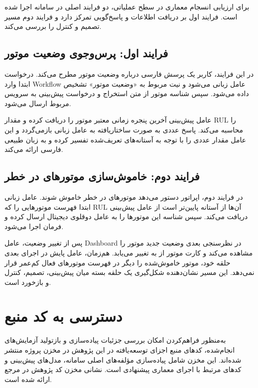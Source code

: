 برای ارزیابی انسجام معماری در سطح عملیاتی، دو فرایند اصلی در سامانه اجرا شده است. فرایند اول بر دریافت اطلاعات و پاسخ‌گویی تمرکز دارد و فرایند دوم مسیر تصمیم و کنترل را بررسی می‌کند.

\subsection{فرایند اول: پرس‌وجوی وضعیت موتور}

در این فرایند، کاربر یک پرسش فارسی درباره وضعیت موتور مطرح می‌کند. درخواست ابتدا وارد \gls{Workflow} عامل زبانی می‌شود و نیت مربوط به «وضعیت موتور» تشخیص داده می‌شود. سپس شناسه موتور از متن استخراج و درخواست پیش‌بینی به سرویس مربوط ارسال می‌شود.

عامل پیش‌بینی آخرین پنجره زمانی معتبر موتور را دریافت کرده و مقدار \gls{RUL} را محاسبه می‌کند. پاسخ عددی به صورت ساختاریافته به عامل زبانی بازمی‌گردد و این عامل مقدار عددی را با توجه به آستانه‌های تعریف‌شده تفسیر کرده و به زبان طبیعی فارسی ارائه می‌کند.



\subsection{فرایند دوم: خاموش‌سازی موتورهای در خطر}

در فرایند دوم، اپراتور دستور می‌دهد موتورهای در خطر خاموش شوند. عامل زبانی ابتدا فهرست موتورهایی را که \gls{RUL} آن‌ها از آستانه پایین‌تر است از عامل پیش‌بینی دریافت می‌کند. سپس شناسه این موتورها را به عامل دوقلوی دیجیتال ارسال کرده و فرمان  اجرا می‌شود.

پس از تغییر وضعیت، عامل \gls{Dashboard} در نظرسنجی بعدی وضعیت جدید موتور را مشاهده می‌کند و کارت موتور از  به  تغییر می‌یابد. هم‌زمان، عامل پایش در اجرای بعدی حلقه خود، موتور خاموش‌شده را دیگر در فهرست موتورهای فعال کم‌عمر قرار نمی‌دهد. این مسیر نشان‌دهنده شکل‌گیری یک حلقه بسته میان پیش‌بینی، تصمیم، کنترل و بازخورد است.


\section{دسترسی به کد منبع}
\label{subsec:source-code-availability}

به‌منظور فراهم‌کردن امکان بررسی جزئیات پیاده‌سازی
و بازتولید آزمایش‌های انجام‌شده، کدهای منبع
اجزای توسعه‌یافته در این پژوهش در مخزن
 پروژه منتشر شده‌اند.
این مخزن شامل پیاده‌سازی مؤلفه‌های اصلی سامانه،
مدل‌های پیش‌بینی و کدهای مرتبط با اجرای
معماری پیشنهادی است. نشانی مخزن کد پژوهش
در مرجع \cite{masterascode2026} ارائه شده است.
